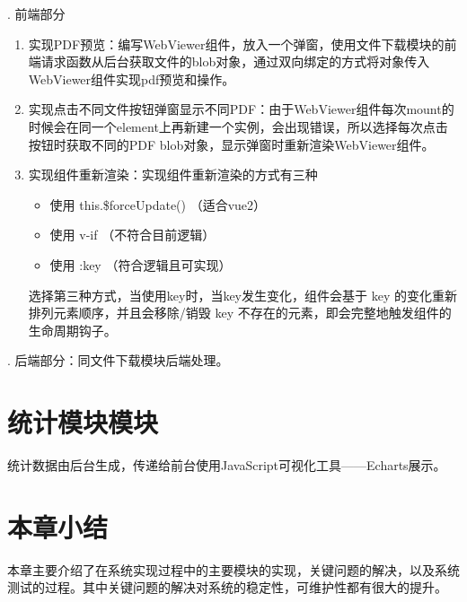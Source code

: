 . 前端部分
\begin{enumerate}
  \item 实现PDF预览：编写WebViewer组件，放入一个弹窗，使用文件下载模块的前端请求函数从后台获取文件的blob对象，通过双向绑定的方式将对象传入WebViewer组件实现pdf预览和操作。
  \item 实现点击不同文件按钮弹窗显示不同PDF：由于WebViewer组件每次mount的时候会在同一个element上再新建一个实例，会出现错误，所以选择每次点击按钮时获取不同的PDF blob对象，显示弹窗时重新渲染WebViewer组件。
  \item 实现组件重新渲染：实现组件重新渲染的方式有三种
        \begin{itemize}
          \item 使用 this.\$forceUpdate() （适合vue2）
          \item 使用 v-if （不符合目前逻辑）
          \item 使用 :key （符合逻辑且可实现）
        \end{itemize}
        选择第三种方式，当使用key时，当key发生变化，组件会基于 key 的变化重新排列元素顺序，并且会移除/销毁 key 不存在的元素，即会完整地触发组件的生命周期钩子。
\end{enumerate}
. 后端部分：同文件下载模块后端处理。


\section{统计模块模块}

统计数据由后台生成，传递给前台使用JavaScript可视化工具——Echarts展示。


\section{本章小结}

本章主要介绍了在系统实现过程中的主要模块的实现，关键问题的解决，以及系统测试的过程。其中关键问题的解决对系统的稳定性，可维护性都有很大的提升。